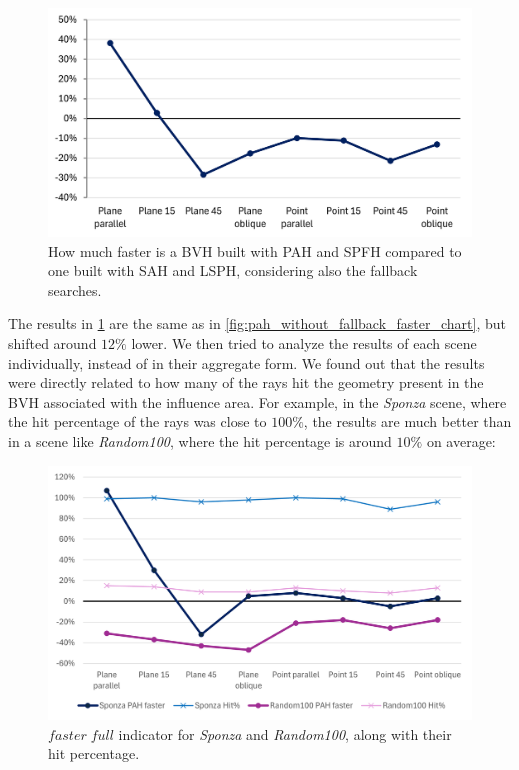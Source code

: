 \documentclass{PoliMi_MasterThesis}
\begin{document}
\begin{figure}[H] 
	\includegraphics[width=\textwidth]{Images/pah_faster_chart.png}
	\caption{How much faster is a BVH built with PAH and SPFH compared to one built with SAH and LSPH, considering also the fallback searches.}
	\label{fig:pah_faster_chart}
\end{figure}

The results in \ref{fig:pah_faster_chart} are the same as in \ref{fig:pah_without_fallback_faster_chart}, but shifted around $12\%$ lower. We then tried to analyze the results of each scene individually, instead of in their aggregate form. We found out that the results were directly related to how many of the rays hit the geometry present in the BVH associated with the influence area. For example, in the \textit{Sponza} scene, where the hit percentage of the rays was close to $100\%$, the results are much better than in a scene like \textit{Random100}, where the hit percentage is around $10\%$ on average:

\begin{figure}[H] 
	\includegraphics[width=\textwidth]{Images/sponza_vs_random100.png}
	\caption{$faster\; full$ indicator for \textit{Sponza} and \textit{Random100}, along with their hit percentage.}
	\label{fig:sponza_vs_random100}
\end{figure}
\end{document}
